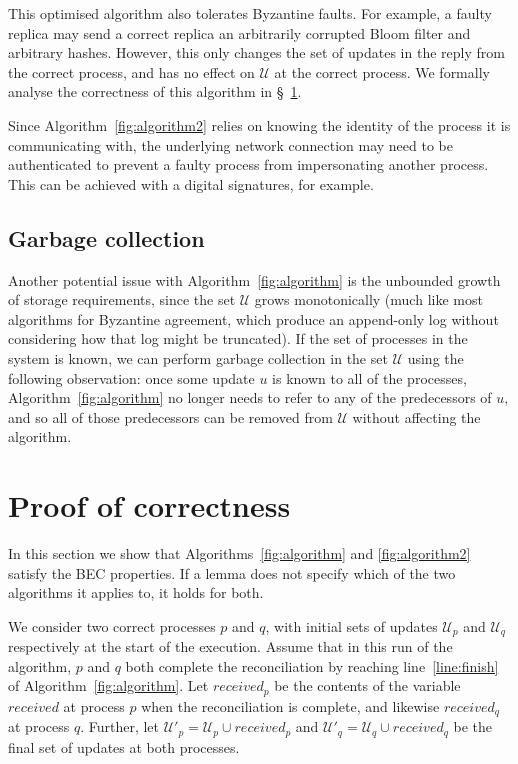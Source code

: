 \documentclass[a4paper,anonymous,USenglish]{lipics-v2019}
\begin{document}
This optimised algorithm also tolerates Byzantine faults.
For example, a faulty replica may send a correct replica an arbitrarily corrupted Bloom filter and arbitrary hashes.
However, this only changes the set of updates in the reply from the correct process, and has no effect on $\mathcal{U}$ at the correct process.
We formally analyse the correctness of this algorithm in \S~\ref{sec:proof}.

Since Algorithm~\ref{fig:algorithm2} relies on knowing the identity of the process it is communicating with, the underlying network connection may need to be authenticated to prevent a faulty process from impersonating another process.
This can be achieved with a digital signatures, for example.

\subsection{Garbage collection}

Another potential issue with Algorithm~\ref{fig:algorithm} is the unbounded growth of storage requirements, since the set $\mathcal{U}$ grows monotonically (much like most algorithms for Byzantine agreement, which produce an append-only log without considering how that log might be truncated).
If the set of processes in the system is known, we can perform garbage collection in the set $\mathcal{U}$ using the following observation: once some update $u$ is known to all of the processes, Algorithm~\ref{fig:algorithm} no longer needs to refer to any of the predecessors of $u$, and so all of those predecessors can be removed from $\mathcal{U}$ without affecting the algorithm.

\section{Proof of correctness}\label{sec:proof}

In this section we show that Algorithms~\ref{fig:algorithm} and \ref{fig:algorithm2} satisfy the BEC properties.
If a lemma does not specify which of the two algorithms it applies to, it holds for both.

We consider two correct processes $p$ and $q$, with initial sets of updates $\mathcal{U}_p$ and $\mathcal{U}_q$ respectively at the start of the execution.
Assume that in this run of the algorithm, $p$ and $q$ both complete the reconciliation by reaching line~\ref{line:finish} of Algorithm~\ref{fig:algorithm}.
Let $\mathit{received}_p$ be the contents of the variable $\mathit{received}$ at process $p$ when the reconciliation is complete, and likewise $\mathit{received}_q$ at process $q$.
Further, let $\mathcal{U}'_p = \mathcal{U}_p \cup \mathit{received}_p$ and $\mathcal{U}'_q = \mathcal{U}_q \cup \mathit{received}_q$ be the final set of updates at both processes.
\end{document}

